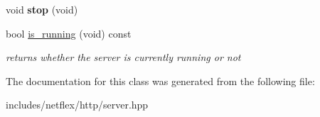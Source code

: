 \begin{DoxyCompactItemize}
\mbox{\label{classnetflex_1_1http_1_1server_aee4736188137a75879e972d325b2c460}} 
void {\bfseries stop} (void)
\item 
\mbox{\label{classnetflex_1_1http_1_1server_a0b901ac09d2aa5a1597197c756307609}} 
bool \hyperlink{classnetflex_1_1http_1_1server_a0b901ac09d2aa5a1597197c756307609}{is\+\_\+running} (void) const
\begin{DoxyCompactList}\small\item\em returns whether the server is currently running or not \end{DoxyCompactList}\end{DoxyCompactItemize}


The documentation for this class was generated from the following file\+:\begin{DoxyCompactItemize}
\item 
includes/netflex/http/server.\+hpp\end{DoxyCompactItemize}
